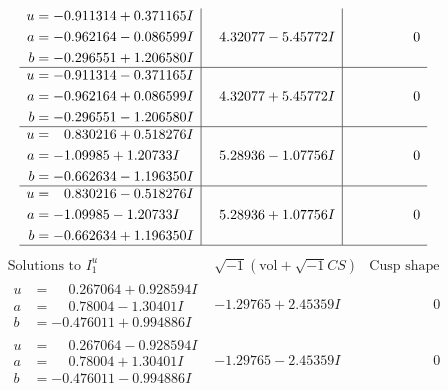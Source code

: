 \documentclass[1p]{elsarticle_modified}
\theoremstyle{definition}
\newcommand{\I}{\sqrt{-1}}
\begin{document}
$$\begin{array}{c|c|c}
\begin{aligned}
u &= -0.911314 + 0.371165 I \\
a &= -0.962164 - 0.086599 I \\
b &= -0.296551 + 1.206580 I\end{aligned}
 & \phantom{-}4.32077 - 5.45772 I & \phantom{-0.000000 } 0 \\ \hline\begin{aligned}
u &= -0.911314 - 0.371165 I \\
a &= -0.962164 + 0.086599 I \\
b &= -0.296551 - 1.206580 I\end{aligned}
 & \phantom{-}4.32077 + 5.45772 I & \phantom{-0.000000 } 0 \\ \hline\begin{aligned}
u &= \phantom{-}0.830216 + 0.518276 I \\
a &= -1.09985 + 1.20733 I \\
b &= -0.662634 - 1.196350 I\end{aligned}
 & \phantom{-}5.28936 - 1.07756 I & \phantom{-0.000000 } 0 \\ \hline\begin{aligned}
u &= \phantom{-}0.830216 - 0.518276 I \\
a &= -1.09985 - 1.20733 I \\
b &= -0.662634 + 1.196350 I\end{aligned}
 & \phantom{-}5.28936 + 1.07756 I & \phantom{-0.000000 } 0\\
 \hline 
 \end{array}$$\newpage$$\begin{array}{c|c|c}  
\text{Solutions to }I^u_{1}& \I (\text{vol} + \sqrt{-1}CS) & \text{Cusp shape}\\
 \hline 
\begin{aligned}
u &= \phantom{-}0.267064 + 0.928594 I \\
a &= \phantom{-}0.78004 - 1.30401 I \\
b &= -0.476011 + 0.994886 I\end{aligned}
 & -1.29765 + 2.45359 I & \phantom{-0.000000 } 0 \\ \hline\begin{aligned}
u &= \phantom{-}0.267064 - 0.928594 I \\
a &= \phantom{-}0.78004 + 1.30401 I \\
b &= -0.476011 - 0.994886 I\end{aligned}
 & -1.29765 - 2.45359 I & \phantom{-0.000000 } 0 \\ \hline\begin{aligned}

\end{aligned}
\end{array}$$
\end{document}
